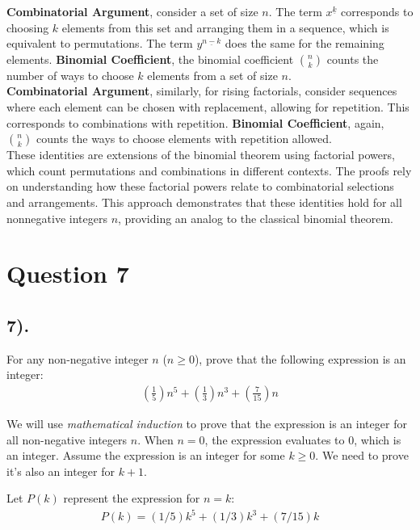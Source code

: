 \documentclass[12pt]{article}
\begin{document}
\textbf{Combinatorial Argument}, consider a set of size \(n\). The term \(x^{\underline{k}}\) corresponds to choosing \(k\) elements from this set and arranging them in a sequence, which is equivalent to permutations.
The term \(y^{\underline{n-k}}\) does the same for the remaining elements.
\textbf{Binomial Coefficient}, the binomial coefficient \(\binom{n}{k}\) counts the number of ways to choose \(k\) elements from a set of size \(n\). \\

\textbf{Combinatorial Argument}, similarly, for rising factorials, consider sequences where each element can be chosen with replacement, allowing for repetition. This corresponds to combinations with repetition.
\textbf{Binomial Coefficient}, again, \(\binom{n}{k}\) counts the ways to choose elements with repetition allowed. \\

These identities are extensions of the binomial theorem using factorial powers, which count permutations and combinations in different contexts. The proofs rely on understanding how these factorial powers relate to combinatorial selections and arrangements.
This approach demonstrates that these identities hold for all nonnegative integers \(n\), providing an analog to the classical binomial theorem.

\section*{Question 7}
\subsection*{7).}
For any non-negative integer $n$ ($n \geq 0$), prove that the following expression is an integer:
\begin{gather*}
    (\frac{1}{5})n^5 + (\frac{1}{3})n^3 + (\frac{7}{15})n
\end{gather*}

We will use \textit{mathematical induction} to prove that the expression is an integer for all non-negative integers $n$.
When $n = 0$, the expression evaluates to 0, which is an integer.
Assume the expression is an integer for some $k \geq 0$. We need to prove it's also an integer for $k + 1$.

Let $P(k)$ represent the expression for $n = k$:
\begin{gather*}
    P(k) = (1/5)k^5 + (1/3)k^3 + (7/15)k
\end{gather*}
\end{document}
